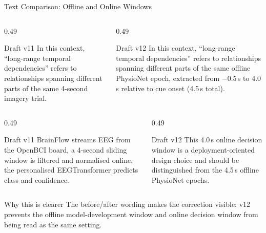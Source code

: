 \documentclass[UTF8,aspectratio=169,11pt]{ctexbeamer}
\begin{document}
\begin{frame}[t]{Text Comparison: Offline and Online Windows}
\scriptsize

    \begin{columns}[T,onlytextwidth]
        \begin{column}{0.49\textwidth}
            \begin{alertblock}{Draft v11}
                In this context, ``long-range temporal dependencies'' refers to relationships spanning different parts of the same 4-second imagery trial.
            \end{alertblock}
        \end{column}
        \begin{column}{0.49\textwidth}
            \begin{block}{Draft v12}
                In this context, ``long-range temporal dependencies'' refers to relationships spanning different parts of the same offline PhysioNet epoch, extracted from $-0.5$\,s to $4.0$\,s relative to cue onset (4.5\,s total).
            \end{block}
        \end{column}
    \end{columns}

    \vspace{0.5em}

    \begin{columns}[T,onlytextwidth]
        \begin{column}{0.49\textwidth}
            \begin{alertblock}{Draft v11}
                BrainFlow streams EEG from the OpenBCI board, a 4-second sliding window is filtered and normalised online, the personalised EEGTransformer predicts class and confidence.
            \end{alertblock}
        \end{column}
        \begin{column}{0.49\textwidth}
            \begin{block}{Draft v12}
                This 4.0\,s online decision window is a deployment-oriented design choice and should be distinguished from the 4.5\,s offline PhysioNet epochs.
            \end{block}
        \end{column}
    \end{columns}

    \vfill

    \begin{block}{Why this is clearer}
        The before/after wording makes the correction visible: v12 prevents the offline model-development window and online decision window from being read as the same setting.
    \end{block}

\end{frame}
\end{document}
